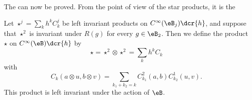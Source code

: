 The  can now be proved. From the point of view of the star products, it is the
\begin{theorem}
	Let $\star^j=\sum_kh^kC_k^j$ be left invariant products on $ C^{\infty}(\eB_j)\dcr{h}$, and suppose that $\star^2$ is invariant under $R(g)$ for every $g\in \eB_2$. Then we define the product $\star$ on $ C^{\infty}(\eB)\dcr{h}$ by
	\begin{equation}
		\star=\star^2\otimes\star^2=\sum_kh^kC_k
	\end{equation}
	with
	\begin{equation}
		C_k(a\otimes u,b\otimes v)=\sum_{k_1+k_2=k}C_{k_1}^2(a,b)C^1_{k_2}(u,v).
	\end{equation}
	This product is left invariant under the action of $\eB$.
\end{theorem}

